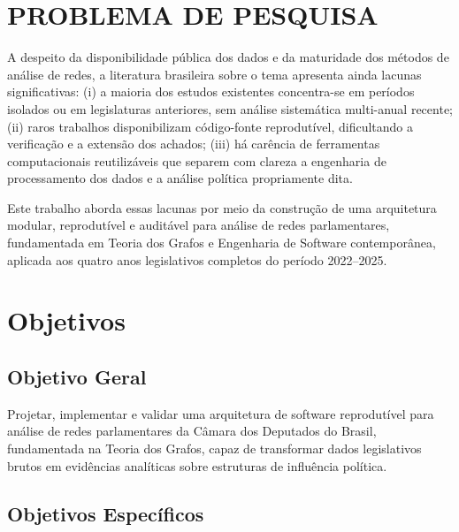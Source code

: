 \documentclass[
      12pt,
      a4paper,
      openright,
      oneside,
      chapter=TITLE,
      section=TITLE,
      english,
      french,
      spanish,
      brazilian
    ]{abntex2}
\begin{document}
    \section{PROBLEMA DE PESQUISA}
    
    A despeito da disponibilidade pública dos dados e da maturidade dos métodos de análise de redes, a literatura brasileira sobre o tema apresenta ainda lacunas significativas: (i) a maioria dos estudos existentes concentra-se em períodos isolados ou em legislaturas anteriores, sem análise sistemática multi-anual recente; (ii) raros trabalhos disponibilizam código-fonte reprodutível, dificultando a verificação e a extensão dos achados; (iii) há carência de ferramentas computacionais reutilizáveis que separem com clareza a engenharia de processamento dos dados e a análise política propriamente dita.
    
    Este trabalho aborda essas lacunas por meio da construção de uma arquitetura modular, reprodutível e auditável para análise de redes parlamentares, fundamentada em Teoria dos Grafos e Engenharia de Software contemporânea, aplicada aos quatro anos legislativos completos do período 2022--2025.
    
    \section{Objetivos}

    \subsection{Objetivo Geral}
    
    Projetar, implementar e validar uma arquitetura de software reprodutível para análise de redes parlamentares da Câmara dos Deputados do Brasil, fundamentada na Teoria dos Grafos, capaz de transformar dados legislativos brutos em evidências analíticas sobre estruturas de influência política.
    
    \subsection{Objetivos Específicos}
    
\end{document}
